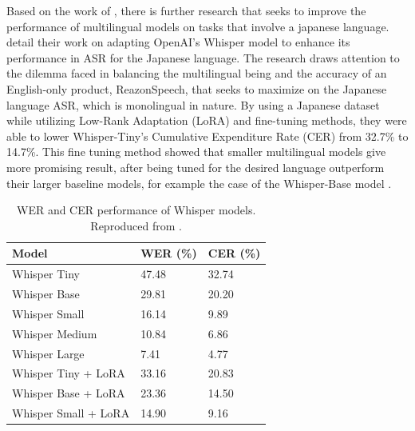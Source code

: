 Based on the work of \textcite{radford2023robust}, there is further research that seeks to improve the performance of multilingual models on tasks that involve a japanese language. \textcite{bajo2024efficient} detail their work on adapting OpenAI’s Whisper model to enhance its performance in ASR for the Japanese language. The research draws attention to the dilemma faced in balancing the multilingual being and the accuracy of an English-only product, ReazonSpeech, that seeks to maximize on the Japanese language ASR, which is monolingual in nature. By using a Japanese dataset while utilizing Low-Rank Adaptation (LoRA) and fine-tuning methods, they were able to lower Whisper-Tiny’s Cumulative Expenditure Rate (CER) from 32.7\% to 14.7\%. This fine tuning method showed that smaller multilingual models give more promising result, after being tuned for the desired language outperform their larger baseline models, for example the case of the Whisper-Base model \parencite{bajo2024efficient}.


\begin{table}[ht]
    \centering
    \caption{WER and CER performance of Whisper models. Reproduced from \cite{bajo2024efficient}.}
    \begin{tabular}{p{4cm}|p{3cm}|p{3cm}}
    \hline
    \textbf{Model}        & \textbf{WER (\%)} & \textbf{CER (\%)} \\ \hline
    Whisper Tiny          & 47.48             & 32.74             \\ 
    Whisper Base          & 29.81             & 20.20             \\ 
    Whisper Small         & 16.14             & 9.89              \\ 
    Whisper Medium        & 10.84             & 6.86              \\ 
    Whisper Large         & 7.41              & 4.77              \\ \hline
    Whisper Tiny + LoRA   & 33.16             & 20.83             \\ 
    Whisper Base + LoRA   & 23.36             & 14.50             \\ 
    Whisper Small + LoRA  & 14.90             & 9.16              \\ \hline


    \end{tabular}
    \label{tab:whisper-performance}
    \end{table}
    
  
